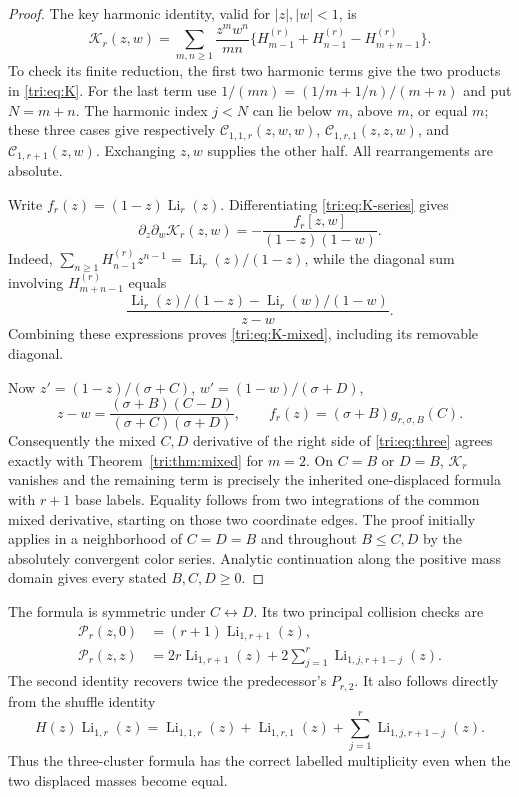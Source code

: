 \documentclass[11pt,a4paper]{article}
\theoremstyle{definition}
\theoremstyle{remark}
\numberwithin{equation}{section}
\begin{document}
\begin{proof}
The key harmonic identity, valid for $|z|,|w|<1$, is
\begin{equation}\label{tri:eq:K-series}
 \mathcal K_r(z,w)
  =\sum_{m,n\ge1}\frac{z^mw^n}{mn}
    \{H_{m-1}^{(r)}+H_{n-1}^{(r)}-H_{m+n-1}^{(r)}\}.
\end{equation}
To check its finite reduction, the first two harmonic terms give
the two products in \eqref{tri:eq:K}. For the last term use
$1/(mn)=(1/m+1/n)/(m+n)$ and put $N=m+n$. The harmonic index
$j<N$ can lie below $m$, above $m$, or equal $m$; these three
cases give respectively
$\mathcal C_{1,1,r}(z,w,w)$,
$\mathcal C_{1,r,1}(z,z,w)$, and
$\mathcal C_{1,r+1}(z,w)$. Exchanging $z,w$ supplies the other
half. All rearrangements are absolute.

Write $f_r(z)=(1-z)\operatorname{Li}_r(z)$. Differentiating
\eqref{tri:eq:K-series} gives
\begin{equation}\label{tri:eq:K-mixed}
 \partial_z\partial_w\mathcal K_r(z,w)
   =-\frac{f_r[z,w]}{(1-z)(1-w)}.
\end{equation}
Indeed,
$\sum_{n\ge1}H_{n-1}^{(r)}z^{n-1}=
\operatorname{Li}_r(z)/(1-z)$, while the diagonal sum involving
$H_{m+n-1}^{(r)}$ equals
\[
 \frac{\operatorname{Li}_r(z)/(1-z)
                    -\operatorname{Li}_r(w)/(1-w)}{z-w}.
\]
Combining these expressions proves \eqref{tri:eq:K-mixed},
including its removable diagonal.

Now $z'=(1-z)/(\sigma+C)$,
$w'=(1-w)/(\sigma+D)$,
\[
 z-w=\frac{(\sigma+B)(C-D)}{(\sigma+C)(\sigma+D)},
 \qquad f_r(z)=(\sigma+B)g_{r,\sigma,B}(C).
\]
Consequently the mixed $C,D$ derivative of the right side of
\eqref{tri:eq:three} agrees exactly with
Theorem~\ref{tri:thm:mixed} for $m=2$. On $C=B$ or $D=B$,
$\mathcal K_r$ vanishes and the remaining term is precisely
the inherited one-displaced formula with $r+1$ base labels.
Equality follows from two integrations of the common mixed
derivative, starting on those two coordinate edges. The proof
initially applies in a neighborhood of $C=D=B$ and throughout
$B\le C,D$ by the absolutely convergent color series. Analytic
continuation along the positive mass domain gives every stated
$B,C,D\ge0$.
\end{proof}

The formula is symmetric under $C\leftrightarrow D$. Its two
principal collision checks are
\begin{align}
 \mathcal P_r(z,0)&=(r+1)\operatorname{Li}_{1,r+1}(z),
                      \label{tri:eq:axis}\\
 \mathcal P_r(z,z)&=2r\operatorname{Li}_{1,r+1}(z)
       +2\sum_{j=1}^{r}\operatorname{Li}_{1,j,r+1-j}(z).
                      \label{tri:eq:diagonal}
\end{align}
The second identity recovers twice the predecessor's $P_{r,2}$.
It also follows directly from the shuffle identity
\[
 H(z)\operatorname{Li}_{1,r}(z)
  =\operatorname{Li}_{1,1,r}(z)
      +\operatorname{Li}_{1,r,1}(z)
      +\sum_{j=1}^{r}\operatorname{Li}_{1,j,r+1-j}(z).
\]
Thus the three-cluster formula has the correct labelled
multiplicity even when the two displaced masses become equal.
\end{document}
